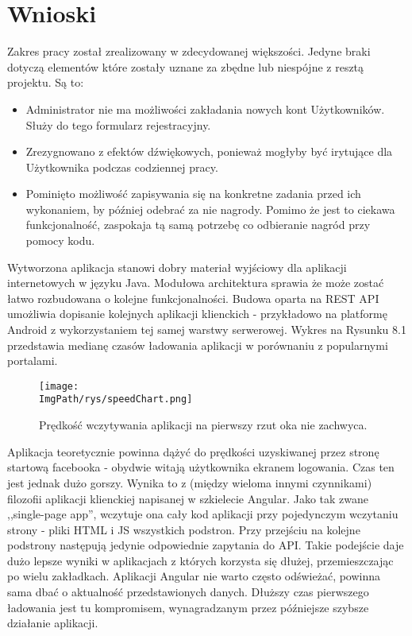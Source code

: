 \documentclass[a4paper,12pt,twoside,openany]{report}
\newcommand{\ImgPath}{.}
\begin{document}
\chapter{Wnioski}
Zakres pracy został zrealizowany w zdecydowanej większości. Jedyne braki dotyczą elementów które zostały uznane za zbędne lub niespójne z resztą projektu. Są to:
\begin{itemize}
 \item Administrator nie ma możliwości zakładania nowych kont Użytkowników. Służy do tego formularz rejestracyjny. 
 \item Zrezygnowano z efektów dźwiękowych, ponieważ mogłyby być irytujące dla Użytkownika podczas codziennej pracy.
 \item Pominięto możliwość zapisywania się na konkretne zadania przed ich wykonaniem, by później odebrać za nie nagrody. Pomimo że jest to ciekawa funkcjonalność, zaspokaja tą samą potrzebę co odbieranie nagród przy pomocy kodu.
 \end{itemize}
 Wytworzona aplikacja stanowi dobry materiał wyjściowy dla aplikacji internetowych w języku Java. Modułowa architektura sprawia że może zostać łatwo rozbudowana o kolejne funkcjonalności. Budowa oparta na REST API umożliwia dopisanie kolejnych aplikacji klienckich - przykładowo na platformę Android z wykorzystaniem tej samej warstwy serwerowej.
Wykres na Rysunku 8.1 przedstawia medianę czasów ładowania aplikacji w porównaniu z popularnymi portalami. 
				\begin{figure}[!htbp]
					\begin{center}
						\centering
						\texttt{[image: \\ImgPath/rys/speedChart.png]}
					\end{center}
					\caption{Prędkość wczytywania aplikacji na pierwszy rzut oka nie zachwyca.}
					\label{UMLTS}
				\end{figure}
Aplikacja teoretycznie powinna dążyć do prędkości uzyskiwanej przez stronę startową facebooka - obydwie witają użytkownika ekranem logowania. Czas ten jest jednak dużo gorszy. Wynika to z (między wieloma innymi czynnikami) filozofii aplikacji klienckiej napisanej w szkielecie Angular. Jako tak zwane ,,single-page app'', wczytuje ona cały kod aplikacji przy pojedynczym wczytaniu strony  - pliki HTML i JS wszystkich podstron. Przy przejściu na kolejne podstrony następują jedynie odpowiednie zapytania do API. Takie podejście daje dużo lepsze wyniki w aplikacjach z których korzysta się dłużej, przemieszczając po wielu zakładkach. Aplikacji Angular nie warto często odświeżać, powinna sama dbać o aktualność przedstawionych danych. Dłuższy czas pierwszego ładowania jest tu kompromisem, wynagradzanym przez późniejsze szybsze działanie aplikacji.\\
\end{document}
